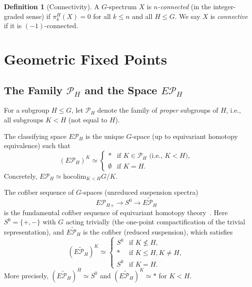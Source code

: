 \documentclass[12pt]{article}
\theoremstyle{definition}
\newtheorem{definition}[theorem]{Definition}
\begin{document}
\begin{definition}[Connectivity]
A $G$-spectrum $X$ is \emph{$n$-connected} (in the integer-graded sense) if $\pi_k^H(X) = 0$ for all $k\leq n$ and all $H\leq G$.  We say $X$ is \emph{connective} if it is $(-1)$-connected.
\end{definition}

\section{Geometric Fixed Points}\label{sec:gfp}

\subsection{The Family $\mathcal{P}_H$ and the Space $E\mathcal{P}_H$}

For a subgroup $H\leq G$, let $\mathcal{P}_H$ denote the family of \emph{proper} subgroups of $H$, i.e., all subgroups $K < H$ (not equal to $H$).

The classifying space $E\mathcal{P}_H$ is the unique $G$-space (up to equivariant homotopy equivalence) such that
\[
   (E\mathcal{P}_H)^K \simeq \begin{cases} * & \text{if } K\in\mathcal{P}_H \text{ (i.e., } K<H\text{)},\\ \emptyset & \text{if } K = H. \end{cases}
\]
Concretely, $E\mathcal{P}_H \simeq \mathrm{hocolim}_{K<H} G/K$.

The cofiber sequence of $G$-spaces (unreduced suspension spectra)
\begin{equation}\label{eq:cofiber}
   E\mathcal{P}_H{}_+ \longrightarrow S^0 \longrightarrow \widetilde{E\mathcal{P}_H}
\end{equation}
is the fundamental cofiber sequence of equivariant homotopy theory~\cite[II.2]{LMS}.  Here $S^0 = \{+,-\}$ with $G$ acting trivially (the one-point compactification of the trivial representation), and $\widetilde{E\mathcal{P}_H}$ is the cofiber (reduced suspension), which satisfies
\[
   (\widetilde{E\mathcal{P}_H})^K \simeq \begin{cases} S^0 & \text{if } K \not\leq H,\\ * & \text{if } K \leq H, K \neq H,\\ S^0 & \text{if } K = H. \end{cases}
\]
More precisely, $({\widetilde{E\mathcal{P}_H}})^H \simeq S^0$ and $({\widetilde{E\mathcal{P}_H}})^K \simeq *$ for $K<H$.
\end{document}
